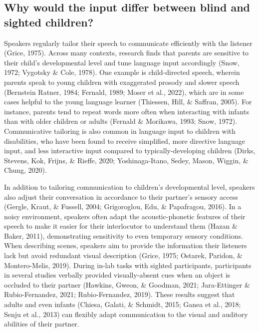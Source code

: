 \documentclass[
  man]{apa6}
\begin{document}
\hypertarget{why-would-the-input-differ-between-blind-and-sighted-children}{%
\subsection{Why would the input differ between blind and sighted children?}\label{why-would-the-input-differ-between-blind-and-sighted-children}}

Speakers regularly tailor their speech to communicate efficiently with the listener (Grice, 1975). Across many contexts, research finds that parents are sensitive to their child's developmental level and tune language input accordingly (Snow, 1972; Vygotsky \& Cole, 1978). One example is child-directed speech, wherein parents speak to young children with exaggerated prosody and slower speech (Bernstein Ratner, 1984; Fernald, 1989; Moser et al., 2022), which are in some cases helpful to the young language learner (Thiessen, Hill, \& Saffran, 2005). For instance, parents tend to repeat words more often when interacting with infants than with older children or adults (Fernald \& Morikawa, 1993; Snow, 1972). Communicative tailoring is also common in language input to children with disabilities, who have been found to receive simplified, more directive language input, and less interactive input compared to typically-developing children (Dirks, Stevens, Kok, Frijns, \& Rieffe, 2020; Yoshinaga-Itano, Sedey, Mason, Wiggin, \& Chung, 2020).

In addition to tailoring communication to children's developmental level, speakers also adjust their conversation in accordance to their partner's sensory access (Gergle, Kraut, \& Fussell, 2004; Grigoroglou, Edu, \& Papafragou, 2016). In a noisy environment, speakers often adapt the acoustic-phonetic features of their speech to make it easier for their interlocutor to understand them (Hazan \& Baker, 2011), demonstrating sensitivity to even temporary sensory conditions. When describing scenes, speakers aim to provide the information their listeners lack but avoid redundant visual description (Grice, 1975; Ostarek, Paridon, \& Montero-Melis, 2019). During in-lab tasks with sighted participants, participants in several studies verbally provided visually-absent cues when an object is occluded to their partner (Hawkins, Gweon, \& Goodman, 2021; Jara-Ettinger \& Rubio-Fernandez, 2021; Rubio-Fernandez, 2019). These results suggest that adults and even infants (Chiesa, Galati, \& Schmidt, 2015; Ganea et al., 2018; Senju et al., 2013) can flexibly adapt communication to the visual and auditory abilities of their partner.
\end{document}
